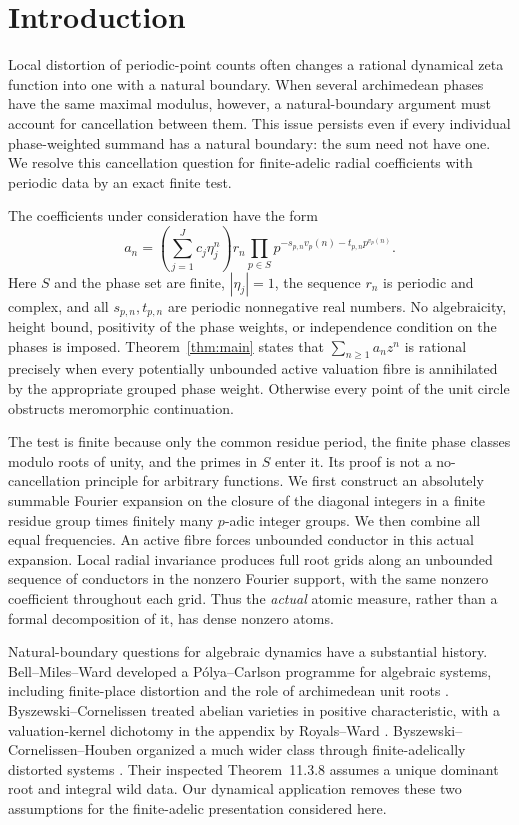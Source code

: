 \section{Introduction}

Local distortion of periodic-point counts often changes a rational
dynamical zeta function into one with a natural boundary. When several
archimedean phases have the same maximal modulus, however, a
natural-boundary argument must account for cancellation between them.
This issue persists even if every individual phase-weighted summand
has a natural boundary: the sum need not have one.
We resolve this cancellation question for finite-adelic radial
coefficients with periodic data by an exact finite test.

The coefficients under consideration have the form
\begin{equation}\label{eq:intro-coeff}
 a_n=\left(\sum_{j=1}^{J}c_j\eta_j^n\right)r_n
 \prod_{p\in S}p^{-s_{p,n}v_p(n)-t_{p,n}p^{v_p(n)}}.
\end{equation}
Here \(S\) and the phase set are finite, \(|\eta_j|=1\), the sequence
\(r_n\) is periodic and complex, and all \(s_{p,n},t_{p,n}\) are
periodic nonnegative real numbers. No algebraicity, height bound,
positivity of the phase weights, or independence condition on the
phases is imposed. Theorem~\ref{thm:main} states that
\(\sum_{n\geq1}a_nz^n\) is rational precisely when every potentially
unbounded active valuation fibre is annihilated by the appropriate
grouped phase weight. Otherwise every point of the unit circle
obstructs meromorphic continuation.

The test is finite because only the common residue period, the finite
phase classes modulo roots of unity, and the primes in \(S\) enter it.
Its proof is not a no-cancellation principle for arbitrary functions.
We first construct an absolutely summable Fourier expansion on the
closure of the diagonal integers in a finite residue group times
finitely many \(p\)-adic integer groups. We then combine all equal
frequencies. An active fibre forces unbounded conductor in this
actual expansion. Local radial invariance produces full root grids
along an unbounded sequence of conductors in the nonzero Fourier support,
with the same nonzero coefficient throughout each grid.
Thus the \emph{actual} atomic measure, rather
than a formal decomposition of it, has dense nonzero atoms.

Natural-boundary questions for algebraic dynamics have a substantial
history. Bell--Miles--Ward developed a P\'olya--Carlson programme for
algebraic systems, including finite-place distortion and the role of
archimedean unit roots \citep{bmw2014}. Byszewski--Cornelissen treated
abelian varieties in positive characteristic, with a valuation-kernel
dichotomy in the appendix by Royals--Ward \citep{bc2018}.
Byszewski--Cornelissen--Houben organized a much wider class through
finite-adelically distorted systems \citep{bch2024}.
Their inspected Theorem~11.3.8 assumes a unique dominant root and
integral wild data. Our dynamical application removes these two
assumptions for the finite-adelic presentation considered here.

